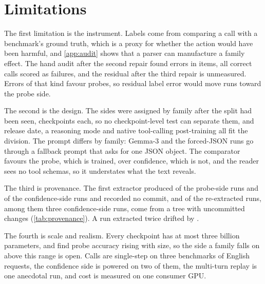 \section{Limitations}
\label{sec:limitations}

The first limitation is the instrument. Labels come from comparing a call with a benchmark's ground truth, which is a proxy for whether the action would have been harmful, and \cref{app:audit} shows that a parser can manufacture a family effect. The hand audit after the second repair found \auditPooledErr{} errors in \auditPooledN{} items, all correct calls scored as failures, and the residual after the third repair is unmeasured. Errors of that kind favour probes, so residual label error would move runs toward the probe side.

The second is the design. The sides were assigned by family after the split had been seen, \nCkptInternals{} checkpoints each, so no checkpoint-level test can separate them, and release date, a reasoning mode and native tool-calling post-training all fit the division. The prompt differs by family: Gemma-3 and the forced-JSON runs go through a fallback prompt that asks for one JSON object. The comparator favours the probe, which is trained, over confidence, which is not, and the reader sees no tool schemas, so it understates what the text reveals.

The third is provenance. The first extractor produced \nFirstExtractInternals{} of the \nInternalsRuns{} probe-side runs and \nFirstExtractConfidence{} of the \nConfidenceRuns{} confidence-side runs and recorded no commit, and \nDirtyRuns{} of the re-extracted runs, among them three confidence-side runs, come from a tree with uncommitted changes (\cref{tab:provenance}). A run extracted twice drifted by \replGapDelta{}.

The fourth is scale and realism. Every checkpoint has at most three billion parameters, and \citet{yeats2026calls} find probe accuracy rising with size, so the side a family falls on above this range is open. Calls are single-step on three benchmarks of English requests, the confidence side is powered on two of them, the multi-turn replay is one anecdotal run, and cost is measured on one consumer GPU.
